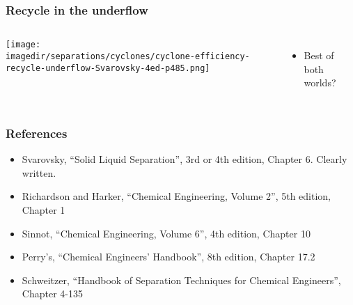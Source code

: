 \begin{frame}\frametitle{Recycle in the underflow}
	\begin{columns}[t]
			\begin{center}
				\texttt{[image: \\imagedir/separations/cyclones/cyclone-efficiency-recycle-underflow-Svarovsky-4ed-p485.png]}
			\end{center}
		\begin{itemize}
			\item	Best of both worlds?
		\end{itemize}
	\end{columns}	
\end{frame}

\begin{frame}\frametitle{References}
	\begin{itemize}
		\item	Svarovsky, ``Solid Liquid Separation'', 3rd or 4th edition, Chapter 6. Clearly written.
		\item	Richardson and Harker, ``Chemical Engineering, Volume 2'', 5th edition, Chapter 1
		\item	Sinnot, ``Chemical Engineering, Volume 6'', 4th edition, Chapter 10
		\item	Perry's, ``Chemical Engineers' Handbook'', 8th edition, Chapter 17.2
		\item	Schweitzer, ``Handbook of Separation Techniques for Chemical Engineers'', Chapter 4-135
	\end{itemize}
\end{frame}